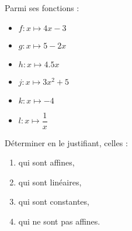 \begin{exercice*}
    Parmi ses fonctions :
    \begin{multicols}{2}
    \begin{itemize}
        \item[] $f:x\longmapsto 4x-3$
        \item[] $g:x\longmapsto 5-2x$
        \item[] $h:x\longmapsto \num{4.5}{x}$
        \columnbreak
        \item[] $j:x\longmapsto 3x^2+5$        
        \item[] $k:x\longmapsto -4$
        \item[] $l:x\longmapsto \dfrac{1}{x}$
    \end{itemize}
    \end{multicols}
    Déterminer en le justifiant, celles :
    \begin{enumerate}
        \item qui sont affines,
        \item qui sont linéaires,
        \item qui sont constantes,
        \item qui ne sont pas affines.
    \end{enumerate}
\end{exercice*}
